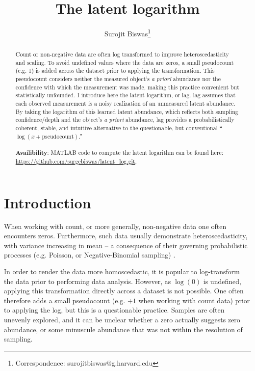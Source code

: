 \documentclass[11pt]{article}
\author[1]{Surojit Biswas\thanks{Correspondence: surojitbiswas@g.harvard.edu}}
\affil[1]{Department of Biomedical Informatics. Harvard Medical School. Boston, MA 02215. USA.}
\date{}
\title{The latent logarithm}
\begin{document}
\maketitle
\vspace{-10mm}
\begin{abstract}
Count or non-negative data are often log transformed to improve heteroscedasticity and scaling. To avoid undefined values where the data are zeros, a small pseudocount (e.g. 1) is added across the dataset prior to applying the transformation. This pseudocount considers neither the measured object's \emph{a priori} abundance nor the confidence with which the measurement was made, making this practice convenient but statistically unfounded. I introduce here the latent logarithm, or lag. lag assumes that each observed measurement is a noisy realization of an unmeasured latent abundance. By taking the logarithm of this learned latent abundance, which reflects both sampling confidence/depth and the object's \emph{a priori} abundance, lag provides a probabilistically coherent, stable, and intuitive alternative to the questionable, but conventional ``$\log(x + \textrm{pseudocount})$.'' \\
\\
\textbf{Availibility}: MATLAB code to compute the latent logarithm can be found here: \url{https://github.com/surgebiswas/latent_log.git}. 
\end{abstract}

\section{Introduction}
When working with count, or more generally, non-negative data one often encounters zeros. Furthermore, such data usually demonstrate heteroscedasticity, with variance increasing in mean -- a consequence of their governing probabilistic processes (e.g. Poisson, or Negative-Binomial sampling) \cite{Hilbe2011}. 

In order to render the data more homoscedastic, it is popular to log-transform the data prior to performing data analysis. However, as $\log(0)$ is undefined, applying this transformation directly across a dataset is not possible. One often therefore adds a small pseudocount (e.g. $+1$ when working with count data) prior to applying the log, but this is a questionable practice. Samples are often unevenly explored, and it can be unclear whether a zero actually suggests zero abundance, or some minuscule abundance that was not within the resolution of sampling. 
\end{document}
